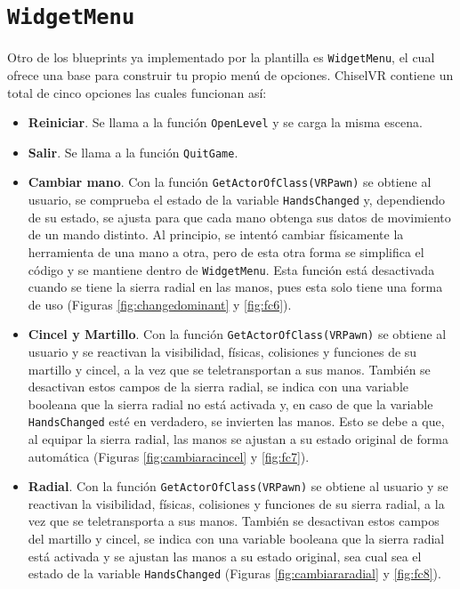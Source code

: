 \section{\texttt{WidgetMenu}}

Otro de los blueprints ya implementado por la plantilla es \texttt{WidgetMenu}, el cual ofrece una base para construir tu propio menú de opciones. ChiselVR contiene un total de cinco opciones las cuales funcionan así:

\begin{itemize}
    \item \textbf{Reiniciar}. Se llama a la función \texttt{OpenLevel} y se carga la misma escena.
    \item \textbf{Salir}. Se llama a la función \texttt{QuitGame}.
    \item \textbf{Cambiar mano}. Con la función \texttt{GetActorOfClass(VRPawn)} se obtiene al usuario, se comprueba el estado de la variable \texttt{HandsChanged} y, dependiendo de su estado, se ajusta para que cada mano obtenga sus datos de movimiento de un mando distinto. Al principio, se intentó cambiar físicamente la herramienta de una mano a otra, pero de esta otra forma se simplifica el código y se mantiene dentro de \texttt{WidgetMenu}. Esta función está desactivada cuando se tiene la sierra radial en las manos, pues esta solo tiene una forma de uso (Figuras \ref{fig:changedominant} y \ref{fig:fc6}).
    \item \textbf{Cincel y Martillo}. Con la función \texttt{GetActorOfClass(VRPawn)} se obtiene al usuario y se reactivan la visibilidad, físicas, colisiones y funciones de su martillo y cincel, a la vez que se teletransportan a sus manos. También se desactivan estos campos de la sierra radial, se indica con una variable booleana que la sierra radial no está activada y, en caso de que la variable \texttt{HandsChanged} esté en verdadero, se invierten las manos. Esto se debe a que, al equipar la sierra radial, las manos se ajustan a su estado original de forma automática (Figuras \ref{fig:cambiaracincel} y \ref{fig:fc7}).
    \item \textbf{Radial}. Con la función \texttt{GetActorOfClass(VRPawn)} se obtiene al usuario y se reactivan la visibilidad, físicas, colisiones y funciones de su sierra radial, a la vez que se teletransporta a sus manos. También se desactivan estos campos del martillo y cincel, se indica con una variable booleana que la sierra radial está activada y se ajustan las manos a su estado original, sea cual sea el estado de la variable \texttt{HandsChanged} (Figuras \ref{fig:cambiararadial} y \ref{fig:fc8}).
\end{itemize}

